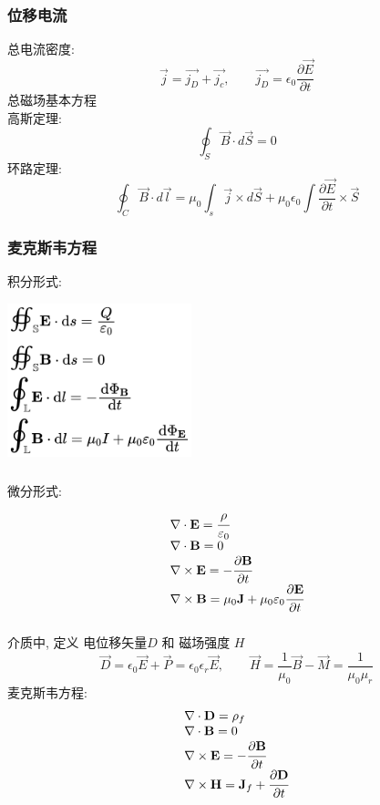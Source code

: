 \begin{frame}
    \frametitle{位移电流}
    总电流密度: \[\vec{j}=\vec{j_D}+\vec{j_c}, \qquad  \vec{j_D}=\epsilon_0 \frac{\partial \vec{E}}{\partial t} \] 
    总磁场基本方程 \\
    高斯定理:\[ \oint_S \vec{B}\cdot d \vec{S} = 0 \] 
    环路定理: \[ \oint_C \vec{B}\cdot d \vec{l} = \mu_0 \int_s \vec{j}\times d \vec{S}+ \mu_0 \epsilon_0 \int \frac{\partial \vec{E}}{\partial t} \times \vec{S} \]
\end{frame}

\begin{frame}
    \frametitle{麦克斯韦方程}
    积分形式:
  \begin{center}
       \includegraphics[width=0.4\textwidth]{figs/42.png}
  \end{center}
\end{frame}

\begin{frame}
      \frametitle{}
      微分形式:
      \[ \begin{array}{l}  
        \nabla \cdot \mathbf{E} =\cfrac{\rho}{\varepsilon _0}  \\  
        \nabla \cdot \mathbf{B} = 0 \\  
        \nabla \times  \mathbf{E} = -\cfrac{\partial \mathbf{B}}{\partial t }  \\  
        \nabla \times  \mathbf{B} = \mu _0\mathbf{J} + \mu _0\varepsilon_0 \cfrac{\partial \mathbf{E}}{\partial t }   
      \end{array} \] 
\end{frame}

\begin{frame}
      \frametitle{}
      介质中, 定义 电位移矢量$D$ 和 磁场强度 $H$
      \[ \vec{D}=\epsilon_0 \vec{E} + \vec{P} = \epsilon_0 \epsilon_r \vec{E},  \qquad \vec{H}=\frac{1}{\mu_0} \vec{B} -\vec{M}= \frac{1}{\mu_0\mu_r} \]
      麦克斯韦方程:
      \[ \begin{array}{l}  
        \nabla \cdot \mathbf{D} =\rho _f \\  
        \nabla \cdot \mathbf{B} = 0 \\  
        \nabla \times  \mathbf{E} = -\cfrac{\partial \mathbf{B}}{\partial t }  \\  
        \nabla \times  \mathbf{H} = \mathbf{J}_f +  \cfrac{\partial \mathbf{D}}{\partial t }   
      \end{array} \]
\end{frame}

